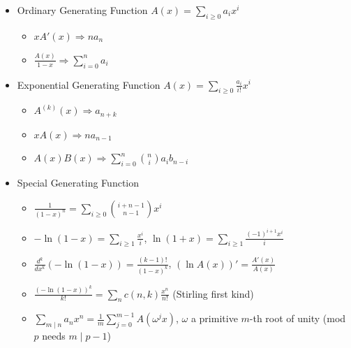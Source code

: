 \begin{itemize}
\item Ordinary Generating Function
$A(x) = \sum_{i\ge 0} a_ix^i$
\begin{itemize}
    \item $xA'(x)            \Rightarrow na_n$
    \item $\frac{A(x)}{1-x}  \Rightarrow \sum_{i=0}^{n} a_i$
\end{itemize}
\item Exponential Generating Function
$A(x) = \sum_{i\ge 0} \frac{a_i}{i!}x^i$
\begin{itemize}
    \item $A^{(k)}(x)        \Rightarrow a_{n+k}$
    \item $xA(x)             \Rightarrow na_{n-1}$
    \item $A(x)B(x)          \Rightarrow \sum_{i=0}^{n} \binom{n}{i}a_ib_{n-i}$
\end{itemize}
\item Special Generating Function
\begin{itemize}
    \item $\frac{1}{(1-x)^n} = \sum_{i\ge 0} \binom{i+n-1}{n-1}x^i$
    \item $-\ln(1-x) = \sum_{i\ge 1} \frac{x^i}{i}$, \quad $\ln(1+x) = \sum_{i\ge 1} \frac{(-1)^{i+1}x^i}{i}$
    \item $\frac{d^k}{dx^k}\left(-\ln(1-x)\right) = \frac{(k-1)!}{(1-x)^k}$, \quad $(\ln A(x))' = \frac{A'(x)}{A(x)}$
    \item $\frac{(-\ln(1-x))^k}{k!} = \sum_{n} c(n, k)\frac{x^n}{n!}$ (Stirling first kind)
    \item $\sum_{m \mid n} a_nx^n = \frac{1}{m}\sum_{j=0}^{m-1} A(\omega^jx)$, $\omega$ a primitive $m$-th root of unity (mod $p$ needs $m \mid p - 1$)
\end{itemize}
\end{itemize}
